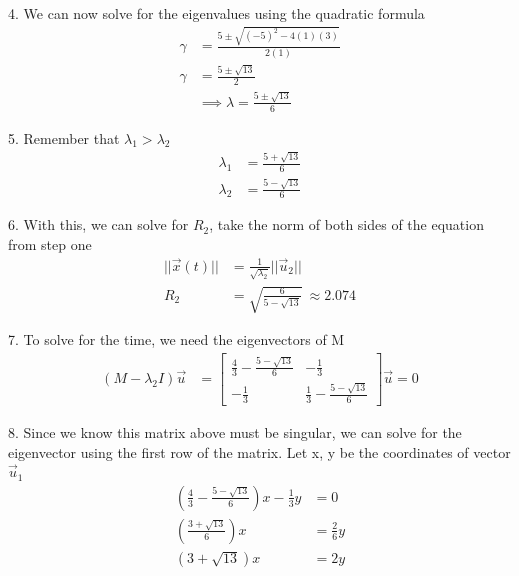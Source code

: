 \documentclass[12pt]{article}
\begin{document}
\begin{enumerate}
          4. We can now solve for the eigenvalues using the quadratic formula
          \begin{align*}
              \gamma{} & = \frac{5 \pm{} \sqrt{(-5)^2 - 4(1)(3)}}{2(1)}      \\
              \gamma{} & = \frac{5 \pm{} \sqrt{13}}{2}                       \\
                       & \implies{} \lambda{}  = \frac{5 \pm{} \sqrt{13}}{6}
          \end{align*}

          5. Remember that $\lambda{}_1 > \lambda{}_2$
          \begin{align*}
              \lambda{}_1 & = \frac{5 + \sqrt{13}}{6} \\
              \lambda{}_2 & = \frac{5 - \sqrt{13}}{6}
          \end{align*}

          6. With this, we can solve for $R_2$, take the norm of both sides of the equation from step one
          \begin{align*}
              ||\vec{x}(t)|| & = \frac{1}{\sqrt{\lambda{}_2}}||\vec{u}_2||   \\
              R_2            & = \sqrt{\frac{6}{5-\sqrt{13}}}~\approx{2.074}
          \end{align*}

          7. To solve for the time, we need the eigenvectors of M
          \begin{align*}
              (M-\lambda_{2}I)\vec{u} & = \begin{bmatrix} \frac{4}{3}-\frac{5 - \sqrt{13}}{6} & -\frac{1}{3} \\ -\frac{1}{3} & \frac{1}{3} - \frac{5 - \sqrt{13}}{6} \end{bmatrix} \vec{u} = 0
          \end{align*}

          8. Since we know this matrix above must be singular, we can solve for the eigenvector using the first row of the matrix. Let x, y be the coordinates of vector $\vec{u}_1$
          \begin{align*}
              (\frac{4}{3} - \frac{5-\sqrt{13}}{6})x -\frac{1}{3}y & = 0            \\
              (\frac{3+\sqrt{13}}{6})x                             & = \frac{2}{6}y \\
              (3+\sqrt{13})x                                       & = 2y
          \end{align*}


\end{enumerate}
\end{document}
